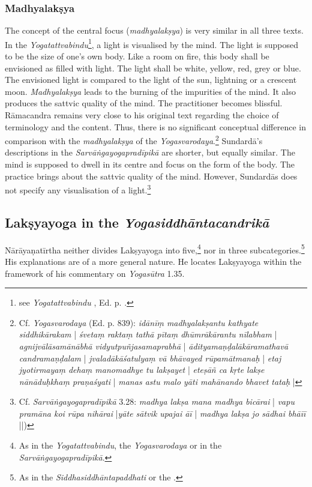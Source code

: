 \subsubsection{Madhyalakṣya}

The concept of the central focus (\textit{madhyalakṣya}) is very similar in all three texts. In the \textit{Yogatattvabindu}\footnote{see \textit{Yogatattvabindu} , Ed. p. \pageref{madhyalaksya}.}, a light is visualised by the mind. The light is supposed to be the size of one's own body. Like a room on fire, this body shall be envisioned as filled with light. The light shall be white, yellow, red, grey or blue. The envisioned light is compared to the light of the sun, lightning or a crescent moon. \textit{Madhyalakṣya} leads to the burning of the impurities of the mind. It also produces the sattvic quality of the mind. The practitioner becomes blissful. Rāmacandra remains very close to his original text regarding the choice of terminology and the content. Thus, there is no significant conceptual difference in comparison with the \textit{madhyalakṣya} of the \textit{Yogasvarodaya}.\footnote{Cf. \textit{Yogasvarodaya} (Ed. p. 839): \textit{idānīṃ madhyalakṣantu kathyate siddhikārakam} | \textit{śvetaṃ raktaṃ tathā pītaṃ dhūmrākārantu nīlabham} | \textit{agnijvālāsamānābhā vidyutpuñjasamaprabhā} | \textit{ādityamaṇḍalākāramathavā candramaṇḍalam} | \textit{jvaladākāśatulyaṃ vā bhāvayed rūpamātmanaḥ} | \textit{etaj jyotirmayaṃ dehaṃ manomadhye tu lakṣayet} | \textit{eteṣāñ ca kṛte lakṣe nānāduḥkhaṃ praṇaśyati} | \textit{manas astu malo yāti mahānando bhavet tataḥ} |} Sundardā's descriptions in the \textit{Sarvāṅgayogapradīpikā} are shorter, but equally similar. The mind is supposed to dwell in its centre and focus on the form of the body. The practice brings about the sattvic quality of the mind. However, Sundardās does not specify any visualisation of a light.\footnote{Cf. \textit{Sarvāṅgayogapradīpikā} 3.28: \textit{madhya lakṣa mana madhya bicārai} | \textit{vapu pramāna koi rūpa nihārai} |\textit{yāte sātvik upajai āī} | \textit{madhya lakṣa jo sādhai bhāīī} ||)}

\subsection{Lakṣyayoga in the \textit{Yogasiddhāntacandrikā}}
\label{laksyayogaintrocandrika}

Nārāyaṇatīrtha neither divides Lakṣyayoga into five,\footnote{As in the \textit{Yogatattvabindu}, the \textit{Yogasvarodaya} or in the \textit{Sarvāṅgayogapradīpikā}. } nor in three subcategories.\footnote{As in the \textit{Siddhasiddhāntapaddhati} or the .} His explanations are of a more general nature. He locates Lakṣyayoga within the framework of his commentary on \textit{Yogasūtra} 1.35.

